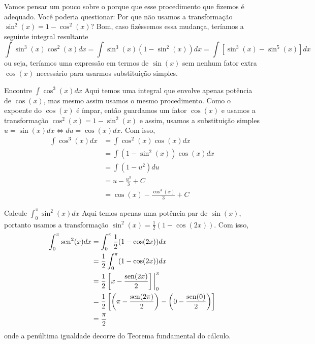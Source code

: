 Vamos pensar um pouco sobre o porque que esse procedimento que fizemos é adequado.
Você poderia questionar: Por que não usamos a transformação
$\sin^2(x)=1-\cos^2(x)$?
Bom, caso fizéssemos essa mudança, teríamos a seguinte integral resultante
\[
  \int \sin^3(x)\cos^2(x)dx
  = \int   \sin^3(x)(1-\sin^2(x))dx
  = \int [ \sin^3(x)- \sin^5(x)]dx
\]
ou seja, teríamos uma expressão em termos de $\sin(x)$ sem nenhum fator
extra $\cos(x)$ necessário para usarmos substituição simples.

\begin{example}
  Encontre \(\int \cos^3(x)dx\)
  \solution
  Aqui temos uma integral que envolve apenas potência de
  $\cos(x)$, mas mesmo assim usamos o mesmo procedimento.
  Como o expoente do $\cos(x)$ é ímpar, então guardamos um fator
  $\cos(x)$ e usamos a transformação $\cos^2(x)= 1-\sin^2(x)$ e assim,
  usamos a substituição simples $u= \sin(x) dx \Leftrightarrow du=\cos(x)dx$.
  Com isso,
  \begin{align*}
    \int \cos^3(x)dx & = \int \cos^2(x) \cos(x)dx       \\
                     & = \int (1-\sin^2(x))\cos(x)dx    \\
                     & = \int (1-u^2)du                 \\
                     & = u- \frac{u^3}{3}+C             \\
                     & = \cos(x)- \frac{\cos^3(x)}{3}+C
  \end{align*}
\end{example}

\begin{example}
  Calcule \(\int_0^{\pi} \sin^2(x) dx\)
  \solution
  Aqui temos apenas uma potência par de $\sin(x)$,
  portanto usamos a transformação
  $\sin^2(x)= \frac{1}{2}(1-\cos(2x))$.
  Com isso,
  \begin{align*}
    \int_0^{\pi} \operatorname{sen}^2(x) dx
    & = \int_0^\pi \frac{1}{2}(1-\cos(2x)) dx \\
    & = \frac{1}{2} \int_0^\pi (1-\cos(2x)) dx \\
    & = \frac{1}{2} \left[  x - \frac{\operatorname{sen}(2x)}{2}\right] \bigg\rvert_{0}^{\pi} \\
    & = \frac{1}{2}
        \left[
          \left( \pi - \frac{\operatorname{sen}(2\pi)}{2} \right)
         -\left(   0 - \frac{\operatorname{sen}(0)}{2}    \right)
        \right] \\
    & = \frac{\pi}{2}
  \end{align*}
  onde a penúltima igualdade decorre do Teorema fundamental do cálculo.
\end{example}

